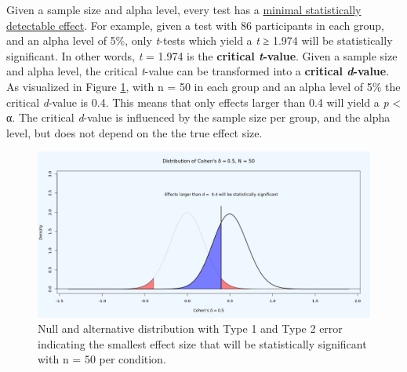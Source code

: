 \documentclass[
  oneside]{krantz}
\begin{document}
Given a sample size and alpha level, every test has a \protect\hyperlink{minimaldetectable}{minimal statistically detectable effect}. For example, given a test with 86 participants in each group, and an alpha level of 5\%, only \emph{t}-tests which yield a \emph{t} ≥ 1.974 will be statistically significant. In other words, \emph{t} = 1.974 is the \textbf{critical \emph{t}-value}. Given a sample size and alpha level, the critical \emph{t}-value can be transformed into a \textbf{critical \emph{d}-value}. As visualized in Figure \ref{fig:distpowerplot1}, with n = 50 in each group and an alpha level of 5\% the critical \emph{d}-value is 0.4. This means that only effects larger than 0.4 will yield a \emph{p} \textless{} α. The critical \emph{d}-value is influenced by the sample size per group, and the alpha level, but does not depend on the the true effect size.



\begin{figure}

{\centering \includegraphics[width=1\linewidth]{images/dpplot50} 

}

\caption{Null and alternative distribution with Type 1 and Type 2 error indicating the smallest effect size that will be statistically significant with n = 50 per condition.}\label{fig:distpowerplot1}
\end{figure}
\end{document}
